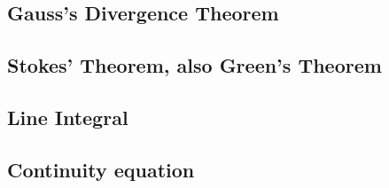 \subsection{Gauss's Divergence Theorem}

\subsection{Stokes' Theorem, also Green's Theorem}

\subsection{Line Integral}

\subsection{Continuity equation}
